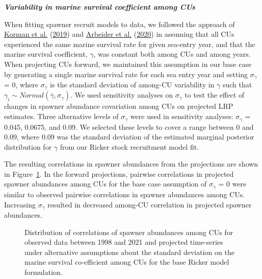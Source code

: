 \documentclass[11pt]{book}
\begin{document}
\textbf{\emph{Variability in marine survival coefficient among CUs}}

When fitting spawner recruit models to data, we followed the approach of \protect\hyperlink{ref-kormanEvaluationFrameworkAssessing2019}{Korman et al.} (\protect\hyperlink{ref-kormanEvaluationFrameworkAssessing2019}{2019}) and \protect\hyperlink{ref-arbeiderInteriorFraserCoho2020}{Arbeider et al.} (\protect\hyperlink{ref-arbeiderInteriorFraserCoho2020}{2020}) in assuming that all CUs experienced the same marine survival rate for given sea-entry year, and that the marine survival coefficient, \(\gamma\), was constant both among CUs and among years. When projecting CUs forward, we maintained this assumption in our base case by generating a single marine survival rate for each sea entry year and setting \(\sigma_{\gamma}\) = 0, where \(\sigma_{\gamma}\) is the standard deviation of among-CU variability in \(\gamma\) such that \(\gamma_i \sim Normal(\bar{\gamma}, \sigma_{\gamma})\). We used sensitivity analyses on \(\sigma_{\gamma}\) to test the effect of changes in spawner abundance covariation among CUs on projected LRP estimates. Three alternative levels of \(\sigma_{\gamma}\) were used in sensitivity analyses: \(\sigma_{\gamma}\) = 0.045, 0.0675, and 0.09. We selected these levels to cover a range between 0 and 0.09, where 0.09 was the standard deviation of the estimated marginal posterior distribution for \(\gamma\) from our Ricker stock recruitment model fit.

The resulting correlations in spawner abundances from the projections are shown in Figure~\ref{fig:coho-sigGammaCorrelation}. In the forward projections, pairwise correlations in projected spawner abundances among CUs for the base case assumption of \(\sigma_{\gamma}\) = 0 were similar to observed pairwise correlations in spawner abundances among CUs. Increasing \(\sigma_{\gamma}\) resulted in decreased among-CU correlation in projected spawner abundances.
\begin{figure}[htb]

{\centering {} 

}

\caption{Distribution of correlations of spawner abundances among CUs for observed data between 1998 and 2021 and projected time-series under alternative assumptions about the standard deviation on the marine survival co-efficient among CUs for the base Ricker model formulation.}\label{fig:coho-sigGammaCorrelation}
\end{figure}
\linebreak
\end{document}
